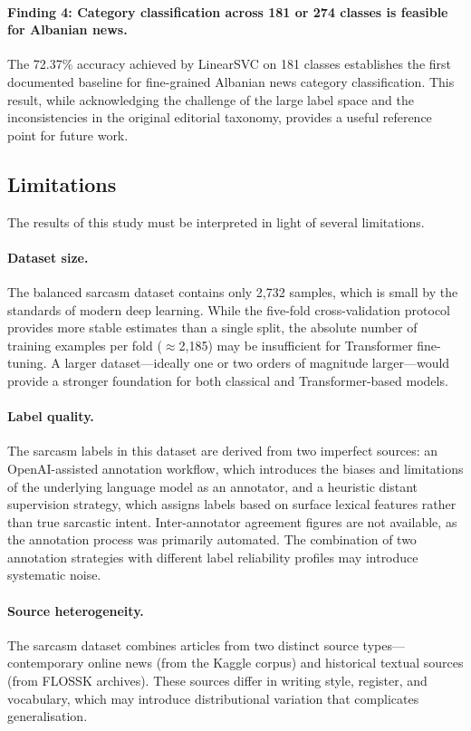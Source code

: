 \documentclass[12pt,a4paper]{article}
\begin{document}
\paragraph{Finding 4: Category classification across 181 or 274 classes is feasible for Albanian news.}
The 72.37\% accuracy achieved by LinearSVC on 181 classes establishes the first documented baseline for fine-grained Albanian news category classification. This result, while acknowledging the challenge of the large label space and the inconsistencies in the original editorial taxonomy, provides a useful reference point for future work.

\subsection{Limitations}
\label{subsec:limitations}

The results of this study must be interpreted in light of several limitations.

\paragraph{Dataset size.}
The balanced sarcasm dataset contains only 2,732 samples, which is small by the standards of modern deep learning. While the five-fold cross-validation protocol provides more stable estimates than a single split, the absolute number of training examples per fold ($\approx$2,185) may be insufficient for Transformer fine-tuning. A larger dataset---ideally one or two orders of magnitude larger---would provide a stronger foundation for both classical and Transformer-based models.

\paragraph{Label quality.}
The sarcasm labels in this dataset are derived from two imperfect sources: an OpenAI-assisted annotation workflow, which introduces the biases and limitations of the underlying language model as an annotator, and a heuristic distant supervision strategy, which assigns labels based on surface lexical features rather than true sarcastic intent. Inter-annotator agreement figures are not available, as the annotation process was primarily automated. The combination of two annotation strategies with different label reliability profiles may introduce systematic noise.

\paragraph{Source heterogeneity.}
The sarcasm dataset combines articles from two distinct source types---contemporary online news (from the Kaggle corpus) and historical textual sources (from FLOSSK archives). These sources differ in writing style, register, and vocabulary, which may introduce distributional variation that complicates generalisation.
\end{document}
